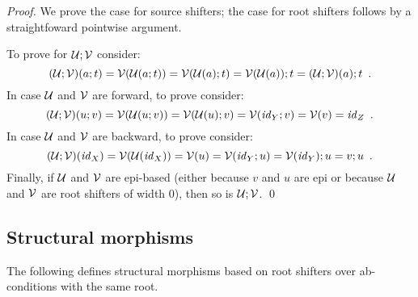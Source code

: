\begin{proof}
We prove the case for source shifters; the case for root shifters follows by a straightfoward pointwise argument.

To prove  for $\mathcal{U};\mathcal{V}$ consider:
\[ (\mathcal{U};\mathcal{V})(a;t) = \mathcal{V}(\mathcal{U}(a;t))= \mathcal{V}(\mathcal{U}(a);t)=\mathcal{V}(\mathcal{U}(a));t=(\mathcal{U};\mathcal{V})(a);t \enspace. \]
In case $\mathcal{U}$ and $\mathcal{V}$ are forward, to prove  consider:
\[ (\mathcal{U};\mathcal{V})(u;v) = \mathcal{V}(\mathcal{U}(u;v)) = \mathcal{V}(\mathcal{U}(u);v) = \mathcal{V}(\mathit{id}_Y;v) = \mathcal{V}(v) = \mathit{id}_Z \enspace. \]
In case $\mathcal{U}$ and $\mathcal{V}$ are backward, to prove  consider:
\[ (\mathcal{U};\mathcal{V})(\mathit{id}_X) = \mathcal{V}(\mathcal{U}(\mathit{id}_X)) = \mathcal{V}(u) = \mathcal{V}(\mathit{id}_Y;u) = \mathcal{V}(\mathit{id}_Y);u = v;u \enspace. \]
Finally, if $\mathcal{U}$ and $\mathcal{V}$ are epi-based (either because $v$ and $u$ are epi or because $\mathcal{U}$ and $\mathcal{V}$ are root shifters of width 0), then so is $\mathcal{U};\mathcal{V}$.
\qed
\end{proof}

\subsection{Structural morphisms}

The following defines structural morphisms based on root shifters over ab-conditions with the same root.

